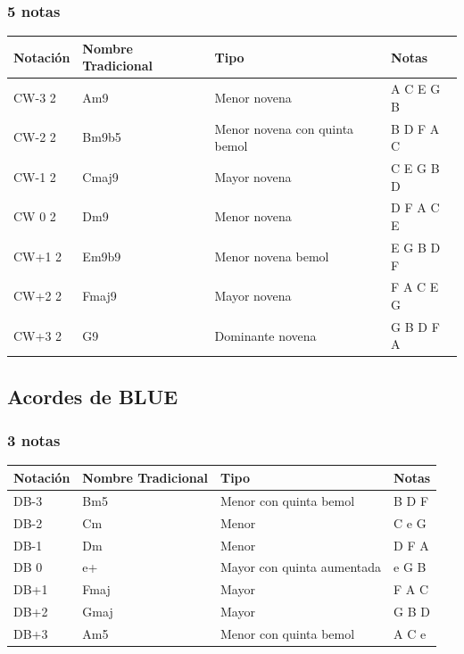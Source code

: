 \documentclass[]{report}
\begin{document}
\subsubsection*{5 notas}

\begin{table}[H]
	\centering
	\begin{tabularx}{\textwidth}{ll>{\raggedright\arraybackslash}Xl}
		\toprule
		Notación        & Nombre Tradicional & Tipo                          & Notas     \\
		\midrule
		\textsf{CW-3} 2 & Am9                & Menor novena                  & A C E G B \\
		\textsf{CW-2} 2 & Bm9b5              & Menor novena con quinta bemol & B D F A C \\
		\textsf{CW-1} 2 & Cmaj9              & Mayor novena                  & C E G B D \\
		\textsf{CW 0} 2 & Dm9                & Menor novena                  & D F A C E \\
		\textsf{CW+1} 2 & Em9b9              & Menor novena bemol            & E G B D F \\
		\textsf{CW+2} 2 & Fmaj9              & Mayor novena                  & F A C E G \\
		\textsf{CW+3} 2 & G9                 & Dominante novena              & G B D F A \\
		\bottomrule
	\end{tabularx}
\end{table}

\subsection*{Acordes de BLUE}

\subsubsection*{3 notas}

\begin{table}[H]
	\centering
	\begin{tabularx}{\textwidth}{ll>{\raggedright\arraybackslash}Xl}
		\toprule
		Notación      & Nombre Tradicional & Tipo                       & Notas \\
		\midrule
		\textsf{DB-3} & Bm5                & Menor con quinta bemol     & B D F \\
		\textsf{DB-2} & Cm                 & Menor                      & C e G \\
		\textsf{DB-1} & Dm                 & Menor                      & D F A \\
		\textsf{DB 0} & e+                 & Mayor con quinta aumentada & e G B \\
		\textsf{DB+1} & Fmaj               & Mayor                      & F A C \\
		\textsf{DB+2} & Gmaj               & Mayor                      & G B D \\
		\textsf{DB+3} & Am5                & Menor con quinta bemol     & A C e \\
		\bottomrule
	\end{tabularx}
\end{table}
\end{document}
